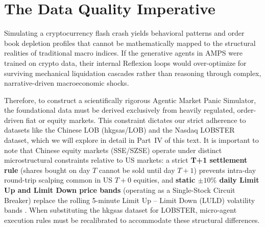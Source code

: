 \section{The Data Quality Imperative}

Simulating a cryptocurrency flash crash yields behavioral patterns and order book depletion profiles that cannot be mathematically mapped to the structural realities of traditional macro indices. If the generative agents in AMPS were trained on crypto data, their internal Reflexion loops would over-optimize for surviving mechanical liquidation cascades rather than reasoning through complex, narrative-driven macroeconomic shocks.

Therefore, to construct a scientifically rigorous Agentic Market Panic Simulator, the foundational data must be derived exclusively from heavily regulated, order-driven fiat or equity markets. This constraint dictates our strict adherence to datasets like the Chinese LOB (hkgsas/LOB) \cite{hkgsas2020benchmark} and the Nasdaq LOBSTER dataset, which we will explore in detail in Part~IV of this text. It is important to note that Chinese equity markets (SSE/SZSE) operate under distinct microstructural constraints relative to US markets: a strict \textbf{T+1 settlement rule} (shares bought on day $T$ cannot be sold until day $T+1$) prevents intra-day round-trip scalping common in US $T+0$ equities, and \textbf{static $\pm10\%$ daily Limit Up and Limit Down price bands} (operating as a Single-Stock Circuit Breaker) replace the rolling 5-minute Limit Up -- Limit Down (LULD) volatility bands \cite{sec2012luld}. When substituting the hkgsas dataset for LOBSTER, micro-agent execution rules must be recalibrated to accommodate these structural differences.
